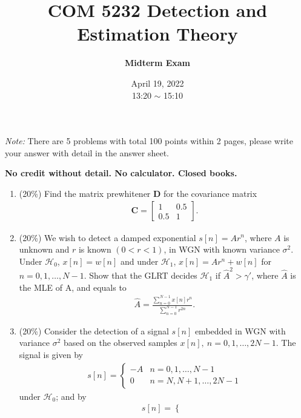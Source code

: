 \documentclass[a4paper,12pt]{article}
\title{\textbf{COM 5232 Detection and Estimation Theory}}
\author{\textbf{Midterm Exam}}
\date{April 19, 2022\\
13:20 $\sim$ 15:10
}
\begin{document}
    \maketitle
    \textit{Note: }There are 5 problems with total 100 points within 2 pages, please write your answer with detail in the answer sheet.

    {\bf No credit without detail.  No calculator. Closed books.}

    \begin{enumerate}
        \item(20\%) 
            Find the matrix prewhitener $\mathbf D$ for the covariance matrix
            \begin{align*}
                \mathbf C=\begin{bmatrix}
                    1 & 0.5\\
                    0.5 & 1 
                    \end{bmatrix}.
            \end{align*}
        \item(20\%) 
            We wish to detect a damped exponential $s[n]=Ar^n$, where $A$ is unknown and $r$ is known $(0<r<1)$, in WGN with known variance $\sigma^2$. Under $\mathcal H_0$, $x[n]=w[n]$ and under $\mathcal H_1$, $x[n]=Ar^n+w[n]$ for $n=0,1,\dots,N-1$. Show that the GLRT decides $\mathcal{H}_1$ if $\hat{A}^2>\gamma'$, where $\hat{A}$ is the MLE of A, and equals to
            \begin{align*}
                \hat{A}=\frac{\sum\limits_{n=0}^{N-1}x[n]r^n}{\sum\limits_{n=0}^{N-1}r^{2n}}.
            \end{align*}
        \item(20\%) 
            Consider the detection of a signal $s[n]$ embedded in WGN with variance $\sigma^2$ based on the observed samples $x[n],\ n=0,1,\dots,2N-1$. The signal is given by
            \begin{align*}
                s[n]=\begin{cases}
                    -A & n=0,1,\dots,N-1\\
                    0 & n=N,N+1,\dots,2N-1 
                    \end{cases}
            \end{align*}
            under $\mathcal H_0$; and by
            \begin{align*}
                s[n]=\begin{cases}

\end{cases}
\end{align*}
\end{enumerate}
\end{document}
